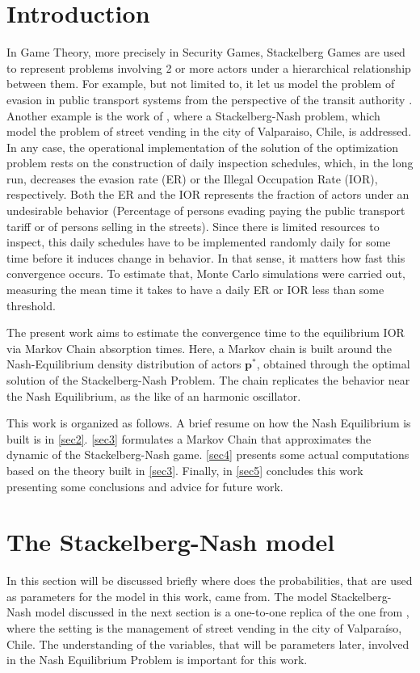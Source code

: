 \documentclass{article}
\newcommand{\pp}{\mathbf{p}}
\begin{document}
\section{Introduction}
In Game Theory, more precisely in Security Games, Stackelberg Games are used to represent problems involving 2 or more actors under a hierarchical relationship between them. For example, but not limited to, it let us model the problem of evasion in public transport systems from the perspective of the transit authority \citep{FareInspection} \citep{BROTCORNE20211}. Another example is the work of \citep{Carrasco}, where a Stackelberg-Nash problem, which model the problem of street vending in the city of Valparaiso, Chile, is addressed. In any case, the operational implementation of the solution of the optimization problem rests on the construction of daily inspection schedules, which, in the long run, decreases the evasion rate (ER) or the Illegal Occupation Rate (IOR), respectively. Both the ER and the IOR represents the fraction of actors under an undesirable behavior (Percentage of persons evading paying the public transport tariff or of persons selling in the streets). Since there is limited resources to inspect, this daily schedules have to be implemented randomly daily for some time before it induces change in behavior. In that sense, it matters how fast this convergence occurs. To estimate that, Monte Carlo simulations were carried out, measuring the mean time it takes to have a daily ER or IOR less than some threshold.\par
The present work aims to estimate the convergence time to the equilibrium IOR via Markov Chain absorption times. Here, a Markov chain is built around the Nash-Equilibrium density distribution of actors $\pp^*$, obtained through the optimal solution of the Stackelberg-Nash Problem. The chain replicates the behavior near the Nash Equilibrium, as the like of an harmonic oscillator.\par 
This work is organized as follows. A brief resume on how the Nash Equilibrium is built is in \autoref{sec2}. \autoref{sec3} formulates a Markov Chain that approximates the dynamic of the Stackelberg-Nash game. \autoref{sec4} presents some actual computations based on the theory built in \autoref{sec3}. Finally, in \autoref{sec5} concludes this work presenting some conclusions and advice for future work.\par


\section{The Stackelberg-Nash model}\label{sec2}
In this section will be discussed briefly where does the probabilities, that are used as parameters for the model in this work, came from. The model Stackelberg-Nash model discussed in the next section is a one-to-one replica of the one from \citep{Carrasco}, where the setting is the management of street vending in the city of Valparaíso, Chile. The understanding of the variables, that will be parameters later, involved in the Nash Equilibrium Problem is important for this work.\par
\end{document}
